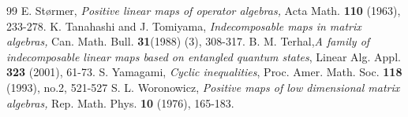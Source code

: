 \documentclass[12pt,a4paper]{amsart}
\theoremstyle{plain}
\theoremstyle{remark}
\theoremstyle{definition}
\begin{document}
\begin{thebibliography}{99}
	 E. St\o rmer, \textit{Positive linear maps of operator algebras,} Acta Math. \textbf{110} (1963), 233-278.
	 K. Tanahashi and J. Tomiyama, \textit{Indecomposable maps in matrix algebras,} Can. Math. Bull. \textbf{31}(1988) (3), 308-317.
	 B. M. Terhal,\textit{A family of indecomposable linear maps based on entangled quantum states}, Linear Alg. Appl. \textbf{323} (2001), 61-73.
  S. Yamagami, \textit{Cyclic inequalities}, Proc. Amer. Math. Soc. {\bf 118} (1993), no.2, 521-527
	 S. L. Woronowicz, \textit{Positive maps of low dimensional matrix algebras,} Rep. Math. Phys. \textbf{10} (1976), 165-183.




		
	
\end{thebibliography}
\end{document}

